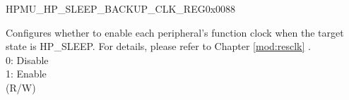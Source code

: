     \begin{register}{H}{PMU\_HP\_SLEEP\_BACKUP\_CLK\_REG}{0x0088}\label{regdesc:PMUHPSLEEPBACKUPCLKREG}
    \regnewline%
    \begin{regdesc}\begin{reglist}
    \label{fielddesc:PMUHPSLEEPBACKUPICGFUNCEN}\item [PMU\_HP\_SLEEP\_BACKUP\_ICG\_FUNC\_EN] Configures whether to enable each peripheral's function clock when the target state is HP\_SLEEP. For details, please refer to Chapter \ref{mod:resclk} \textit{}.\\
0: Disable\\
1: Enable\\
(R/W)
    \end{reglist}\end{regdesc}
    \end{register}


